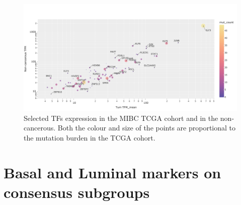 \begin{figure}[!htb]
    \centering
    \includegraphics[width=1.0\textwidth,keepaspectratio]{Sections/Network_I/Resources/selective_pruning/sel_tfs/sel_tfs_mean_tum_healthy.png}
    \caption{Selected TFs expression in the MIBC TCGA cohort and in the non-cancerous. Both the colour and size of the points are proportional to the mutation burden in the TCGA cohort.}
    \label{fig:ap:sel_tfs_mean}
\end{figure}


\section{Basal and Luminal markers on consensus subgroups} \label{s:ap:sel_prun_markers}

